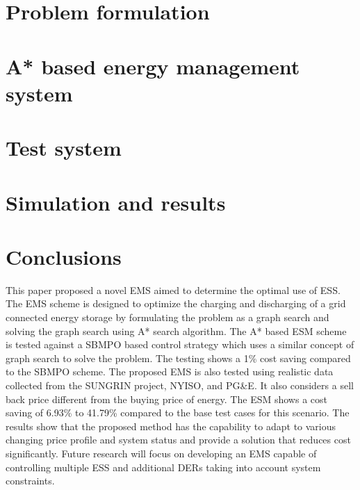 \documentclass[journal]{IEEEtran}
\begin{document}
\section{Problem formulation}
\label{formulation}


\section{A* based energy management system} \label{A*}




\section{Test system} \label{sys}


\section{Simulation and results}



\section{Conclusions}
This paper proposed a novel EMS aimed to determine the optimal use of ESS. The EMS scheme is designed to optimize the charging and discharging of a grid connected energy storage by formulating the problem as a graph search and solving the graph search using A* search algorithm. The A* based ESM scheme is tested against a SBMPO based control strategy which uses a similar concept of graph search to solve the problem.
The testing shows a 1\% cost saving compared to the SBMPO scheme. The proposed EMS is also tested using realistic data collected from the SUNGRIN project, NYISO, and PG\&E. It also considers a sell back price different from the buying price of energy. The ESM shows a cost saving of 6.93\% to 41.79\% compared to the base test cases for this scenario. The results show that the proposed method has the capability to adapt to various changing price profile and system status and provide a solution that reduces cost significantly. Future research will focus on developing an EMS capable of controlling multiple ESS and additional  DERs taking into account system constraints.







\ifCLASSOPTIONcaptionsoff
  \newpage
\fi
\end{document}
